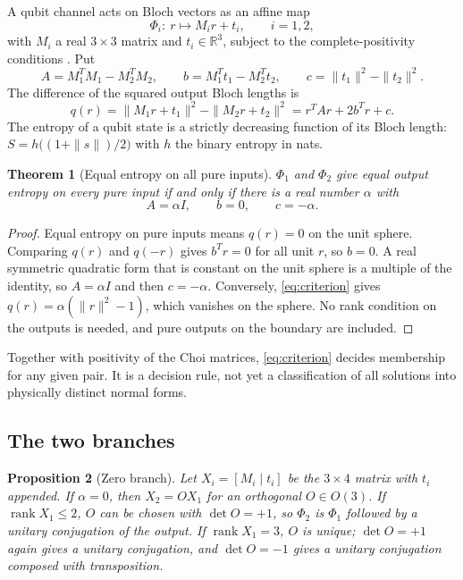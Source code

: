\documentclass[12pt,a4paper]{article}
\newtheorem{theorem}{Theorem}[section]
\newtheorem{proposition}[theorem]{Proposition}
\begin{document}
A qubit channel acts on Bloch vectors as an affine map
\[
\Phi_i:\ r\mapsto M_ir+t_i,\qquad i=1,2,
\]
with $M_i$ a real $3\times3$ matrix and $t_i\in\mathbb R^3$, subject to the complete-positivity conditions \cite{RuskaiSzarekWerner2002}. Put
\[
A=M_1^TM_1-M_2^TM_2,\qquad b=M_1^Tt_1-M_2^Tt_2,\qquad
c=\|t_1\|^2-\|t_2\|^2 .
\]
The difference of the squared output Bloch lengths is
\begin{equation}
q(r)=\|M_1r+t_1\|^2-\|M_2r+t_2\|^2=r^TAr+2b^Tr+c .
\label{eq:q}
\end{equation}
The entropy of a qubit state is a strictly decreasing function of its Bloch length: $S=h\bigl((1+\|s\|)/2\bigr)$ with $h$ the binary entropy in nats.

\begin{theorem}[Equal entropy on all pure inputs]
\label{thm:criterion}
$\Phi_1$ and $\Phi_2$ give equal output entropy on every pure input if and only if there is a real number $\alpha$ with
\begin{equation}
A=\alpha I,\qquad b=0,\qquad c=-\alpha .
\label{eq:criterion}
\end{equation}
\end{theorem}

\begin{proof}
Equal entropy on pure inputs means $q(r)=0$ on the unit sphere. Comparing $q(r)$ and $q(-r)$ gives $b^Tr=0$ for all unit $r$, so $b=0$. A real symmetric quadratic form that is constant on the unit sphere is a multiple of the identity, so $A=\alpha I$ and then $c=-\alpha$. Conversely, \eqref{eq:criterion} gives $q(r)=\alpha(\|r\|^2-1)$, which vanishes on the sphere. No rank condition on the outputs is needed, and pure outputs on the boundary are included.
\end{proof}

Together with positivity of the Choi matrices, \eqref{eq:criterion} decides membership for any given pair. It is a decision rule, not yet a classification of all solutions into physically distinct normal forms.

\subsection{The two branches}

\begin{proposition}[Zero branch]
\label{prop:zero}
Let $X_i=[M_i\mid t_i]$ be the $3\times4$ matrix with $t_i$ appended. If $\alpha=0$, then $X_2=OX_1$ for an orthogonal $O\in O(3)$. If $\operatorname{rank}X_1\le2$, $O$ can be chosen with $\det O=+1$, so $\Phi_2$ is $\Phi_1$ followed by a unitary conjugation of the output. If $\operatorname{rank}X_1=3$, $O$ is unique; $\det O=+1$ again gives a unitary conjugation, and $\det O=-1$ gives a unitary conjugation composed with transposition.
\end{proposition}
\end{document}
